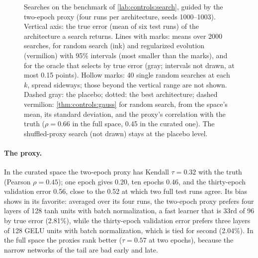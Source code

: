 \begin{refsection}
\begin{figure}[t]
\begin{fullwidth}
\par\smallskip
{}
\caption{Searches on the benchmark of \cref{lab:controls:search}, guided by the two-epoch proxy (four runs per architecture, seeds 1000--1003). Vertical axis: the true error (mean of six test runs) of the architecture a search returns. Lines with marks: means over 2000 searches, for random search (ink) and regularized evolution (vermilion) with 95\% intervals (most smaller than the marks), and for the oracle that selects by true error (gray; intervals not drawn, at most 0.15 points). Hollow marks: 40 single random searches at each $k$, spread sideways; those beyond the vertical range are not shown. Dashed gray: the placebo; dotted: the best architecture; dashed vermilion: \cref{thm:controls:gauss} for random search, from the space's mean, its standard deviation, and the proxy's correlation with the truth ($\rho=0.66$ in the full space, 0.45 in the curated one). The shuffled-proxy search (not drawn) stays at the placebo level.}\label{fig:controls:search}
\end{fullwidth}
\end{figure}

\paragraph{The proxy.} In the curated space the two-epoch proxy has Kendall $\tau=0.32$ with the truth (Pearson $\rho=0.45$); one epoch gives 0.20, ten epochs 0.46, and the thirty-epoch validation error 0.56, close to the 0.52 at which two full test runs agree. Its bias shows in its favorite: averaged over its four runs, the two-epoch proxy prefers four layers of 128 tanh units with batch normalization, a fast learner that is 33rd of 96 by true error (2.81\%), while the thirty-epoch validation error prefers three layers of 128 GELU units with batch normalization, which is tied for second (2.04\%). In the full space the proxies rank better ($\tau=0.57$ at two epochs), because the narrow networks of the tail are bad early and late.


\end{refsection}
